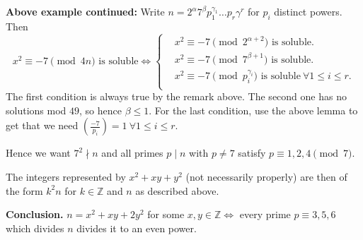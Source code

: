 \documentclass{article}
\theoremstyle{definition}
\begin{document}
\textbf{Above example continued:} Write $n = 2^{\alpha}7^{\beta}p_1^{\gamma_1}\ldots p_{r}\gamma^r$ for $p_i$ distinct powers. Then
\[
x^2 \equiv -7 \pmod{4n} \text{ is soluble} \iff \begin{cases}
    &x^2 \equiv -7 \pmod{2^{\alpha+2}} \text{ is soluble.} \\
    &x^2 \equiv -7 \pmod{7^{\beta+1}} \text{ is soluble.} \\
    &x^2 \equiv -7 \pmod{p_i^{\gamma_i}} \text{ is soluble}~\forall 1\le i\le r. \\
\end{cases}
\]
The first condition is always true by the remark above. The second one has no solutions mod $49$, so hence $\beta\le 1$. For the last condition, use the above lemma to get that we need $\left(\frac{-7}{p_i} \right) = 1 ~\forall 1 \le i \le r$.
\vspace{1mm}

Hence we want $7^2 \nmid n$ and all primes $p \mid n$ with $p \neq 7$ satisfy $p \equiv 1,2,4 \pmod{7}$.
\vspace{1mm}

The integers represented by $x^2+xy+y^2$ (not necessarily properly) are then of the form $k^2n$ for $k \in \mathbb{Z}$ and $n$ as described above.
\vspace{1mm}

\textbf{Conclusion.} $n = x^2+xy+2y^2$ for some $x,y \in \mathbb{Z} \iff$ every prime $p \equiv 3,5,6$ which divides $n$ divides it to an even power.
\vspace{1mm}
\end{document}
